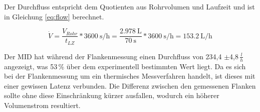 Der Durchfluss entspricht dem Quotienten aus Rohrvolumen und Laufzeit und ist in Gleichung \ref{eq:flow} berechnet.

\begin{equation}
	\label{eq:flow}
	\dot V = \frac{V_{Rohr}}{t_{LZ}}*\SI{3600}{\second\per\hour} = \frac{\SI{2,978}{\liter}}{\SI{70}{\second}}*\SI{3600}{\second\per\hour} = \SI{153,2}{\liter\per\hour}
\end{equation}

Der MID hat während der Flankenmessung einen Durchfluss von 234,4 $\pm$4,8\,$\frac{l}{h}$ angezeigt, was 53\,\% über dem experimentell bestimmten Wert liegt. Da es sich bei der Flankenmessung um ein thermisches Messverfahren handelt, ist dieses mit einer gewissen Latenz verbunden. Die Differenz zwischen den gemessenen Flanken sollte ohne diese Einschränkung kürzer ausfallen, wodurch ein höherer Volumenstrom resultiert.



